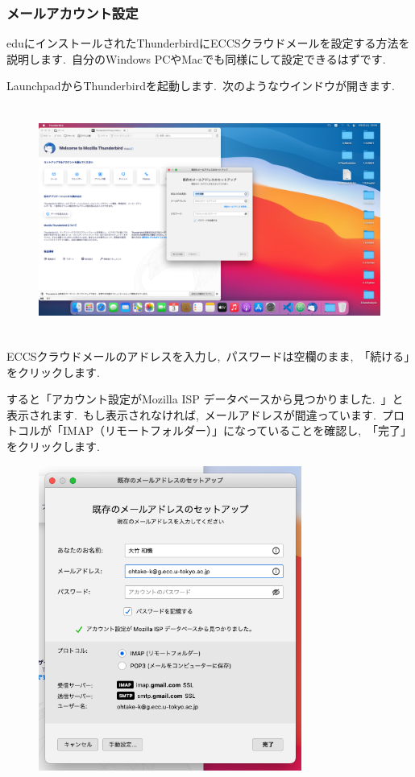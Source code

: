 \documentclass{jarticle}
\begin{document}

\subsubsection{メールアカウント設定}
eduにインストールされたThunderbirdにECCSクラウドメールを設定する方法を説明します.\ 
自分のWindows PCやMacでも同様にして設定できるはずです.\ 

LaunchpadからThunderbirdを起動します.\ 
次のようなウインドウが開きます.\
\begin{figure}[H]
  \centering
  \includegraphics[height=7.5cm]{fig/MacThunderbird1.png}
\end{figure}
ECCSクラウドメールのアドレスを入力し,\ パスワードは空欄のまま,\ 「続ける」をクリックします.\ 

\newpage
すると「アカウント設定がMozilla ISP データベースから見つかりました.\ 」と表示されます.\ 
もし表示されなければ,\ メールアドレスが間違っています.\ 
プロトコルが「IMAP（リモートフォルダー）」になっていることを確認し,\ 「完了」をクリックします.\ 
\begin{figure}[H]
  \centering
  \includegraphics[height=10cm]{fig/MacThunderbird2trim.png}
\end{figure}
\end{document}
